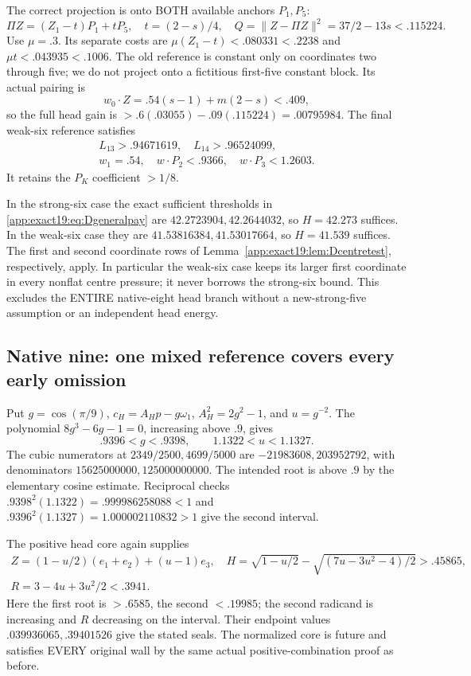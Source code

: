 \documentclass[11pt]{article}
\theoremstyle{definition}
\theoremstyle{remark}
\begin{document}
The correct projection is onto BOTH available anchors \(P_1,P_5\):
\[
 \Pi Z=(Z_1-t)P_1+tP_5,\quad t=(2-s)/4,\quad
                          Q=\|Z-\Pi Z\|^2=37/2-13s<.115224 .
\]
Use \(\mu=.3\).
Its separate costs are
\(\mu(Z_1-t)<.080331<.2238\) and \(\mu t<.043935<.1006\).
The old reference is constant only on coordinates two through five;
we do not project onto a fictitious first-five constant block.
Its actual pairing is
\[
                     w_0\cdot Z=.54(s-1)+m(2-s)<.409 ,
\]
so the full head gain is \(>.6(.03055)-.09(.115224)=.00795984\).
The final weak-six reference satisfies
\[
\begin{gathered}
 L_{13}>.94671619,\quad L_{14}>.96524099,\\
 w_1=.54,\quad w\cdot P_2<.9366,\quad w\cdot P_3<1.2603 .
\tag{D19eightweak}\label{app:exact19:eq:Deightweak}
\end{gathered}
\]
It retains the \(P_K\) coefficient \(>1/8\).

In the strong-six case the exact sufficient thresholds in
\eqref{app:exact19:eq:Dgeneralpay} are
\(42.2723904,42.2644032\), so \(H=42.273\) suffices.
In the weak-six case they are \(41.53816384,41.53017664\), so
\(H=41.539\) suffices.
The first and second coordinate rows of
Lemma~\ref{app:exact19:lem:Dcentretest}, respectively, apply.
In particular the weak-six case keeps its larger first coordinate in
every nonflat centre pressure; it never borrows the strong-six bound.
This excludes the ENTIRE native-eight head branch without a
new-strong-five assumption or an independent head energy.

\subsection{Native nine: one mixed reference covers every early omission}
\label{app:exact19:Dninereference}

Put \(g=\cos(\pi/9)\), \(c_H=A_Hp-g\omega_1\),
\(A_H^2=2g^2-1\), and \(u=g^{-2}\).
The polynomial \(8g^3-6g-1=0\), increasing above \(.9\), gives
\[
                    .9396<g<.9398,\qquad 1.1322<u<1.1327 .
\]
The cubic numerators at \(2349/2500,4699/5000\) are
\(-21983608,203952792\), with denominators
\(15625000000,125000000000\).
The intended root is above \(.9\) by the elementary cosine estimate.
Reciprocal checks
\(.9398^2(1.1322)=.999986258088<1\) and
\(.9396^2(1.1327)=1.000002110832>1\)
give the second interval.

The positive head core again supplies
\[
\begin{gathered}
 Z=(1-u/2)(e_1+e_2)+(u-1)e_3,\quad
 H=\sqrt{1-u/2}-\sqrt{(7u-3u^2-4)/2}>.45865,\\
 R=3-4u+3u^2/2<.3941 .
\end{gathered}
\]
Here the first root is \(>.6585\), the second \(<.19985\);
the second radicand is increasing and \(R\) decreasing on the interval.
Their endpoint values \(.039936065,.39401526\) give the stated seals.
The normalized core is future and satisfies EVERY original wall by
the same actual positive-combination proof as before.
\end{document}
